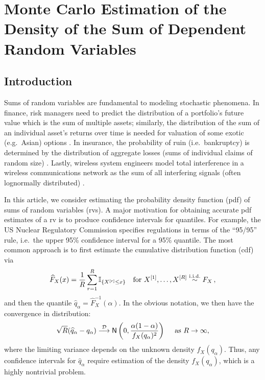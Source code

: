 \chapter{Monte Carlo Estimation of the Density of the Sum of Dependent Random Variables}

\section{Introduction}

Sums of random variables are fundamental to modeling stochastic phenomena. In finance, risk managers need to predict the distribution of a portfolio's future value which is the sum of multiple assets; similarly, the distribution of the sum of an individual asset's returns over time is needed for valuation of some exotic (e.g.\ Asian) options \cite{mcneil2015quantitative,Rueschendorf2013}. In insurance, the probability of ruin (i.e.\ bankruptcy) is determined by the distribution of aggregate losses (sums of individual claims of random size) \cite{klugman2012loss,asmussen2010ruin}. Lastly, wireless system engineers model total interference in a wireless communications network as the sum of all interfering signals (often lognormally distributed) \cite{fischione2007approximation}. 

In this article, we consider estimating the probability density function (pdf) of sums of random variables (rvs). A major motivation for obtaining accurate pdf estimates of a rv is to produce confidence intervals for quantiles. For example, the US Nuclear Regulatory Commission specifies regulations in terms of the ``95/95'' rule, i.e.\ the upper 95\% confidence interval for a 95\% quantile.  The most common approach  \cite{asmussen2017conditional}  is to first  estimate the cumulative distribution function (cdf) via
\[ \widehat{F}_X(x) = \frac1R \sum_{r=1}^R \mathbb{I}_{\{ X^{[r]} \le x \}} \quad \text{for } X^{[1]}, \dots, X^{[R]} \overset{\mathrm{i.i.d.}}{\sim} F_X \,, \]
and then the quantile  $\widehat{q}_\alpha=  \widehat{F}_X^{-1}(\alpha)$. In the obvious notation, we then have the convergence in distribution:
\[ 
\sqrt{R} (\widehat{q}_\alpha - q_\alpha) \stackrel{\mathcal{D}}{\longrightarrow} {\sf N}\left(0, \frac{\alpha(1-\alpha)}{f_X(q_\alpha)^2}\right)  \quad \text{ as } R \to \infty,
\]
where the limiting variance depends on the unknown density $f_X(q_\alpha)$.  Thus, any confidence intervals for $\widehat{q}_\alpha$ require estimation of the density $f_X(q_\alpha)$, which is a highly nontrivial problem.


